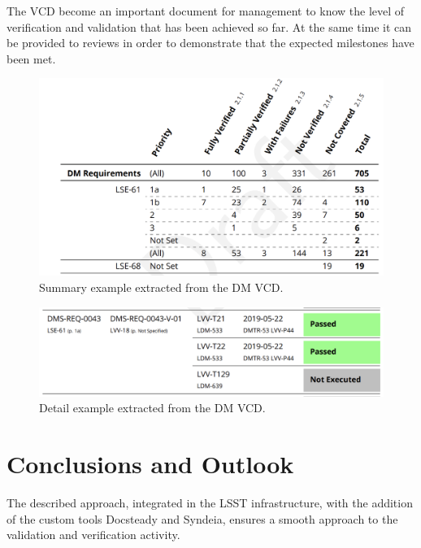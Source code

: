 The VCD become an important document for management to know the level of verification and validation that has been achieved so far.
At the same time it can be provided to reviews in order to demonstrate that the expected milestones have been met.

\begin{figure}
\begin{center}
\includegraphics[width=\textwidth]{imgs/VCDsumm.png}
 \caption{Summary example extracted from the DM VCD.}
 \label{fig:vcdsum}
\end{center}
\end{figure}

\begin{figure}
\begin{center}
\includegraphics[width=\textwidth]{imgs/VCDdetail.png}
 \caption{Detail example extracted from the DM VCD.}
 \label{fig:vcddetail}
\end{center}
\end{figure}

\section{Conclusions and Outlook}

The described approach, integrated in the LSST infrastructure, with the addition of the custom tools Docsteady and Syndeia, 
ensures a smooth approach to the validation and verification activity. 

